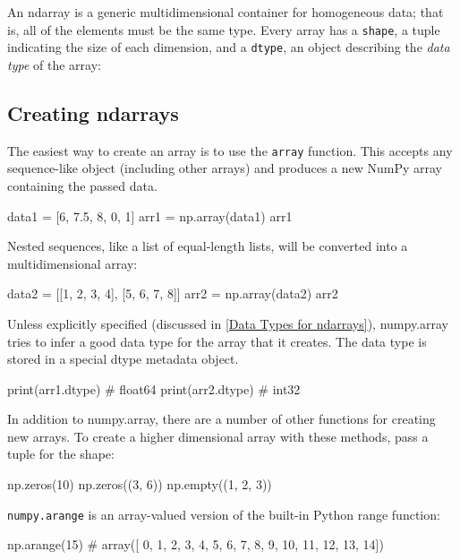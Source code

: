 An ndarray is a generic multidimensional container for homogeneous data; that is, all of the elements must be the same type. Every array has a \verb|shape|, a tuple indicating the size of each dimension, and a \verb|dtype|, an object describing the \emph{data type} of the array:

\subsection{Creating ndarrays}
The easiest way to create an array is to use the \verb|array| function. This accepts any sequence-like object (including other arrays) and produces a new NumPy array containing the passed data.
\begin{pyc}
data1 = [6, 7.5, 8, 0, 1]
arr1 = np.array(data1)
arr1
\end{pyc}

Nested sequences, like a list of equal-length lists, will be converted into a multidimensional array:
\begin{pyc}
data2 = [[1, 2, 3, 4], [5, 6, 7, 8]]
arr2 = np.array(data2)
arr2
\end{pyc}

Unless explicitly specified (discussed in \autoref{Data Types for ndarrays}), numpy.array tries to infer a good data type for the array that it creates. The data type is stored in a special dtype metadata object.
\begin{pyc}
print(arr1.dtype) # float64
print(arr2.dtype) # int32 
\end{pyc}

In addition to numpy.array, there are a number of other functions for creating new arrays. To create a higher dimensional array with these methods, pass a tuple for the shape:
\begin{pyc}
np.zeros(10)
np.zeros((3, 6))
np.empty((1, 2, 3))    
\end{pyc}


\verb|numpy.arange| is an array-valued version of the built-in Python range function:
\begin{pyc}
np.arange(15)
# array([ 0,  1,  2,  3,  4,  5,  6,  7,  8,  9, 10, 11, 12, 13, 14])
\end{pyc}

